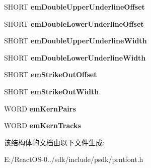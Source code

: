\begin{DoxyCompactItemize}
\item 
\mbox{\label{struct___e_x_t_t_e_x_t_m_e_t_r_i_c_a857187a0194163aae57b580e771897f2}} 
S\+H\+O\+RT {\bfseries em\+Double\+Upper\+Underline\+Offset}
\item 
\mbox{\label{struct___e_x_t_t_e_x_t_m_e_t_r_i_c_a92d17e438729cb94c0a32b5dd9487ed5}} 
S\+H\+O\+RT {\bfseries em\+Double\+Lower\+Underline\+Offset}
\item 
\mbox{\label{struct___e_x_t_t_e_x_t_m_e_t_r_i_c_a6a137558d6a0cf562f476b18a908008f}} 
S\+H\+O\+RT {\bfseries em\+Double\+Upper\+Underline\+Width}
\item 
\mbox{\label{struct___e_x_t_t_e_x_t_m_e_t_r_i_c_a01cc5ff94075e1a09f94f7341fae4b75}} 
S\+H\+O\+RT {\bfseries em\+Double\+Lower\+Underline\+Width}
\item 
\mbox{\label{struct___e_x_t_t_e_x_t_m_e_t_r_i_c_a650379e4b78e6a57d2044ceb51d251ff}} 
S\+H\+O\+RT {\bfseries em\+Strike\+Out\+Offset}
\item 
\mbox{\label{struct___e_x_t_t_e_x_t_m_e_t_r_i_c_a87c45a88d5a9b9a9227cc86c621713eb}} 
S\+H\+O\+RT {\bfseries em\+Strike\+Out\+Width}
\item 
\mbox{\label{struct___e_x_t_t_e_x_t_m_e_t_r_i_c_abcd4931bd13d4cf744f7766e40b3df43}} 
W\+O\+RD {\bfseries em\+Kern\+Pairs}
\item 
\mbox{\label{struct___e_x_t_t_e_x_t_m_e_t_r_i_c_a1fab559433c4baf85e6dd82c5df560a2}} 
W\+O\+RD {\bfseries em\+Kern\+Tracks}
\end{DoxyCompactItemize}


该结构体的文档由以下文件生成\+:\begin{DoxyCompactItemize}
\item 
E\+:/\+React\+O\+S-\/0../sdk/include/psdk/prntfont.\+h\end{DoxyCompactItemize}
